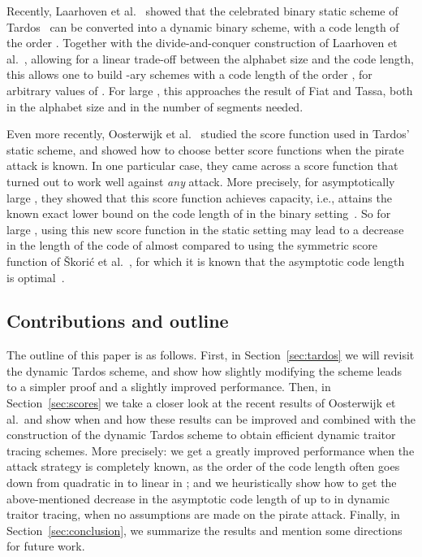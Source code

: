 \documentclass[10pt,a4paper,twocolumn]{article}
\begin{document}
Recently, Laarhoven et al.~\cite{laarhoven13tit} showed that the celebrated binary static scheme of Tardos~\cite{tardos03} can be converted into a dynamic binary scheme, with a code length of the order . Together with the divide-and-conquer construction of Laarhoven et al.~\cite{laarhoven12wifs}, allowing for a linear trade-off between the alphabet size and the code length, this allows one to build -ary schemes with a code length of the order , for arbitrary values of . For large , this approaches the result of Fiat and Tassa, both in the alphabet size and in the number of segments needed.

Even more recently, Oosterwijk et al.~\cite{oosterwijk13} studied the score function used in Tardos' static scheme, and showed how to choose better score functions when the pirate attack is known. In one particular case, they came across a score function that turned out to work well against \textit{any} attack. More precisely, for asymptotically large , they showed that this score function achieves capacity, i.e., attains the known exact lower bound on the code length of  in the binary setting~\cite{huang12}. So for large , using this new score function in the static setting may lead to a decrease in the length of the code of almost  compared to using the symmetric score function of \v{S}kori\'{c} et al.~\cite{skoric08}, for which it is known that the asymptotic code length  is optimal~\cite{laarhoven13ihmmsec}.

\subsection{Contributions and outline}

The outline of this paper is as follows. First, in Section~\ref{sec:tardos} we will revisit the dynamic Tardos scheme, and show how slightly modifying the scheme leads to a simpler proof and a slightly improved performance. Then, in Section~\ref{sec:scores} we take a closer look at the recent results of Oosterwijk et al.\ and show when and how these results can be improved and combined with the construction of the dynamic Tardos scheme to obtain efficient dynamic traitor tracing schemes. More precisely: we get a greatly improved performance when the attack strategy is completely known, as the order of the code length often goes down from quadratic in  to linear in ; and we heuristically show how to get the above-mentioned decrease in the asymptotic code length of up to  in dynamic traitor tracing, when no assumptions are made on the pirate attack. Finally, in Section~\ref{sec:conclusion}, we summarize the results and mention some directions for future work. 
\end{document}

